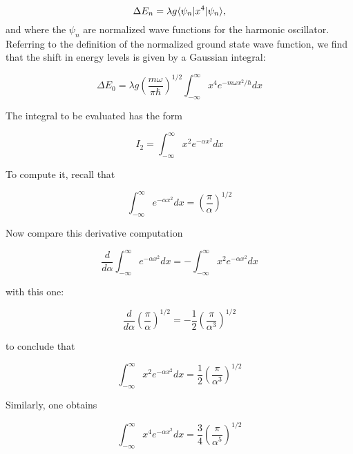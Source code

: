 \begin{equation}
\label{DeltaEn]}
\Delta E_n = \lambda g \langle \psi_n | x^4 | \psi_n \rangle ,
\end{equation}
and where the $\psi_n$ are normalized wave functions for the harmonic oscillator.  Referring to the definition of the normalized ground state wave function, we find that the shift in energy levels is given by a Gaussian integral:

\begin{equation}
\Delta E_0 = \lambda g \left(\frac{m\omega}{\pi\hbar}\right)^{ 1/2 } \int_{-\infty}^\infty x^4 e^{-m\omega x^2 / \hbar} dx
\end{equation}

The integral to be evaluated has the form

\begin{equation}
I_2 = \int_{-\infty}^\infty x^2 e^{-\alpha x^2} dx
\end{equation}

To compute it, recall that 

\begin{equation}
\int_{-\infty}^\infty e^{-\alpha x^2} dx 
= \left( \frac{\pi}{\alpha} \right)^{1/2}
\end{equation}

Now compare this derivative computation

\begin{equation}
\frac{d}{d\alpha} \int_{-\infty}^\infty e^{-\alpha x^2} dx = - \int_{-\infty}^\infty x^2 e^{-\alpha x^2} dx
\end{equation}

with this one:

\begin{equation}
\frac{d}{d\alpha} \left(\frac{\pi}{\alpha}\right)^{1/2} = -\frac{1}{2}\left(\frac{\pi}{ \alpha^3 } \right)^{1/2}
\end{equation}

to conclude that

\begin{equation}
 \int_{-\infty}^\infty x^2 e^{-\alpha x^2} dx =  \frac{1}{2}\left(\frac{\pi}{ \alpha^3 } \right)^{1/2}
\end{equation}

Similarly, one obtains

\begin{equation}
 \int_{-\infty}^\infty x^4 e^{-\alpha x^2} dx =  \frac{3}{4}\left(\frac{\pi}{ \alpha^5 } \right)^{1/2}
\end{equation}

